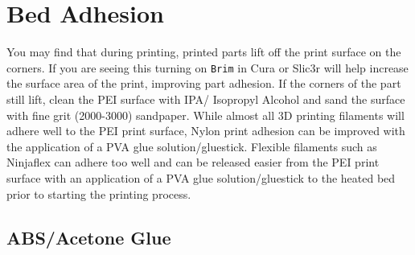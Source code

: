 


\section{Bed Adhesion}
You may find that during printing, printed parts lift off the print surface on the corners. If you are seeing this turning on \texttt{Brim} in Cura or Slic3r will help increase the surface area of the print, improving part adhesion. If the corners of the part still lift, clean the PEI surface with IPA/ Isopropyl Alcohol and sand the surface with fine grit (2000-3000) sandpaper. While almost all 3D printing filaments will adhere well to the PEI print surface, Nylon print adhesion can be improved with the application of a PVA glue solution/gluestick. Flexible filaments such as Ninjaflex can adhere too well and can be released easier from the PEI print surface with an application of a PVA glue solution/gluestick to the heated bed prior to starting the printing process.


\subsection{ABS/Acetone Glue}
\label{sec:ABS/Acetone Glue}

